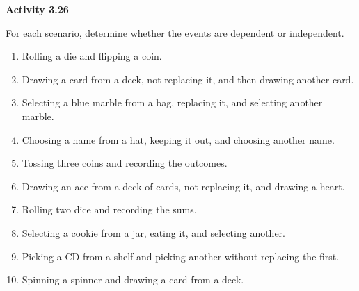 \vspace{0.3ex}
\noindent\textbf{Activity 3.26}

\vspace{0.2ex}

For each scenario, determine whether the events are dependent or independent.

\begin{enumerate}[label=\color{blue}\arabic*.]
    \item Rolling a die and flipping a coin.
    \item Drawing a card from a deck, not replacing it, and then drawing another card.
    \item Selecting a blue marble from a bag, replacing it, and selecting another marble.
    \item Choosing a name from a hat, keeping it out, and choosing another name.
    \item Tossing three coins and recording the outcomes.
    \item Drawing an ace from a deck of cards, not replacing it, and drawing a heart.
    \item Rolling two dice and recording the sums.
    \item Selecting a cookie from a jar, eating it, and selecting another.
    \item Picking a CD from a shelf and picking another without replacing the first.
    \item Spinning a spinner and drawing a card from a deck.
\end{enumerate}
